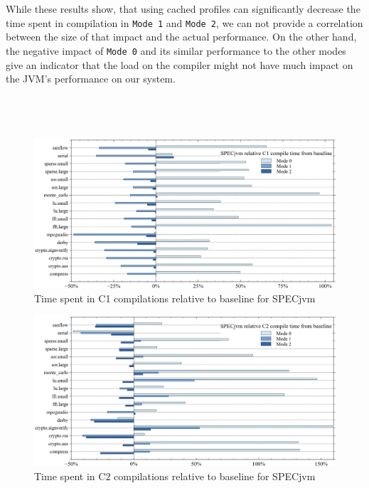 \\\\
While these results show, that using cached profiles can significantly decrease the time spent in compilation in \texttt{Mode 1} and \texttt{Mode 2}, we can not provide a correlation between the size of that impact and the actual performance. On the other hand, the negative impact of \texttt{Mode 0} and its similar performance to the other modes give an indicator that the load on the compiler might not have much impact on the JVM's performance on our system. 
\\\\
\\\\
\begin{figure}[ht]
  \begin{center}
    \centering
    \includegraphics[width=1.0\textwidth]{figures/all_variation_compiletime_c1.png}
    \caption{Time spent in C1 compilations relative to baseline for SPECjvm}
    \label{f:all_variation_compiletime_c1}
  \end{center}
\end{figure}
\begin{figure}[ht]
  \begin{center}
    \centering
    \includegraphics[width=1.0\textwidth]{figures/all_variation_compiletime_c2.png}
    \caption{Time spent in C2 compilations relative to baseline for SPECjvm}
    \label{f:all_variation_compiletime_c2}
  \end{center}
\end{figure}
